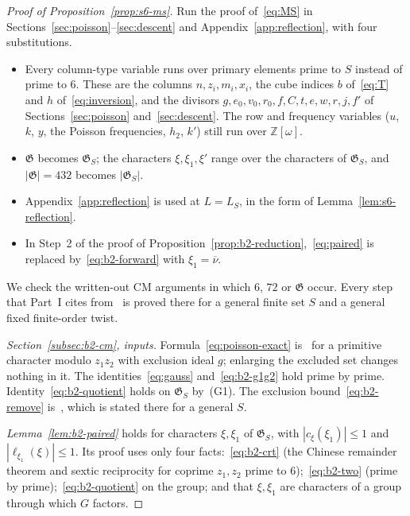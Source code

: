 \documentclass[11pt]{article}
\numberwithin{equation}{section}
\newcommand{\OO}{\mathbb Z[\omega]}
\begin{document}
\begin{proof}[Proof of Proposition~\ref{prop:s6-ms}]
Run the proof of~\eqref{eq:MS} in Sections~\ref{sec:poisson}--\ref{sec:descent} and
Appendix~\ref{app:reflection}, with four substitutions.
\begin{itemize}
\item[(S1)] Every column-type variable runs over primary elements prime to $S$ instead of prime to $6$. These
 are the columns $n,z_i,m_i,x_i$, the cube indices $b$ of~\eqref{eq:T} and $h$ of~\eqref{eq:inversion}, and
 the divisors $g,e_0,v_0,r_0,f,C,t,e,w,r,j,f'$ of Sections~\ref{sec:poisson} and~\ref{sec:descent}. The
 row and frequency variables ($u$, $k$, $y$, the Poisson frequencies, $h_2$, $k'$) still run over $\OO$.
\item[(S2)] $\mathfrak G$ becomes $\mathfrak G_S$; the characters $\xi,\xi_1,\xi'$ range over the
 characters of $\mathfrak G_S$, and $|\mathfrak G|=432$ becomes $|\mathfrak G_S|$.
\item[(S3)] Appendix~\ref{app:reflection} is used at $L=L_S$, in the form of Lemma~\ref{lem:s6-reflection}.
\item[(S4)] In Step~2 of the proof of Proposition~\ref{prop:b2-reduction},~\eqref{eq:paired} is replaced
 by~\eqref{eq:b2-forward} with $\xi_1=\overline\nu$.
\end{itemize}
We check the written-out CM arguments in which $6$, $72$ or $\mathfrak G$ occur. Every step that Part~I cites
from~\cite{OAI1112} is proved there for a general finite set $S$ and a general fixed finite-order twist.

\emph{Section~\ref{subsec:b2-cm}, inputs.} Formula~\eqref{eq:poisson-exact} is~\cite[Lemma~21]{QF} for a
primitive character modulo $z_1z_2$ with exclusion ideal $g$; enlarging the excluded set changes nothing in
it. The identities~\eqref{eq:gauss} and~\eqref{eq:b2-g1g2} hold prime by prime. Identity~\eqref{eq:b2-quotient}
holds on $\mathfrak G_S$ by~(G1). The exclusion bound~\eqref{eq:b2-remove} is~\cite[Lemma~4.4]{OAI1112}, which is
stated there for a general $S$.

\emph{Lemma~\ref{lem:b2-paired}} holds for characters $\xi,\xi_1$ of $\mathfrak G_S$, with $|c_\xi(\xi_1)|\le1$
and $|\ell_{\xi_1}(\xi)|\le1$. Its proof uses only four facts:~\eqref{eq:b2-crt} (the Chinese remainder theorem
and sextic reciprocity for coprime $z_1,z_2$ prime to $6$);~\eqref{eq:b2-two} (prime by
prime);~\eqref{eq:b2-quotient} on the group; and that $\xi,\xi_1$ are characters of a group through which $G$
factors.


\end{proof}
\end{document}

